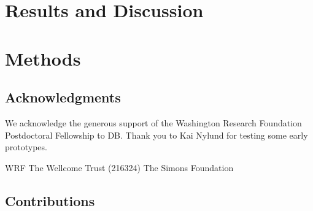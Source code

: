 \documentclass{article}
\begin{document}
\section{Results and Discussion}


\section{Methods}


\subsection{Acknowledgments}

We acknowledge the generous support of the Washington Research Foundation Postdoctoral Fellowship to DB. Thank you to Kai Nylund for testing some early prototypes.

WRF
The Wellcome Trust (216324)
The Simons Foundation

\subsection{Contributions}


\printbibliography
\end{document}
